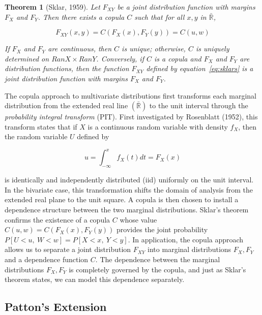 \documentclass[12pt]{article}
\newtheorem{thm}{Theorem}
\begin{document}
\begin{thm} [Sklar, 1959] \label{thm:skl}
Let $F_{XY}$ be a joint distribution function with margins $F_{X}$ and
$F_{Y}$. Then there exists a copula $C$ such that for all $x,y$ in
$\bar{\mathbb{R}}$,

\begin{equation} \label{eq:sklars}
F_{XY}\left( x,y\right) =C\left(F_{X}\left(x\right), F_{Y}\left(y\right)\right) = C\left(u,w\right)
\end{equation}

If $F_{X}$ and $F_{Y}$ are continuous, then $C$ is unique; otherwise, $C$
is uniquely determined on $RanX\times RanY$. Conversely, if $C$ is a copula
and $F_{X}$ and $F_{Y}$ are distribution functions, then the function
$F_{XY}$ defined by equation~\ref{eq:sklars} is a joint distribution
function with margins $F_{X}$ and $F_{Y}$.
\end{thm}

The copula approach to multivariate distributions first transforms each
marginal distribution from the extended real line $\left(\bar{\mathbb{R}}\right)$
to the unit interval through the \textit{probability integral transform}
(PIT). First investigated by Rosenblatt (1952), this transform states that
if $X$ is a continuous random variable with density $f_{X}$, then the
random variable $U$ defined by

\begin{equation} \label{eqn:PIT}
u=\int_{-\infty}^{x}f_{X}\left(t\right) dt=F_{X}\left(x\right)
\end{equation}

is identically and independently distributed (iid) uniformly on the unit
interval. In the bivariate case, this transformation shifts the domain of
analysis from the extended real plane to the unit square. A copula is
then chosen to install a dependence structure between the two marginal
distributions. Sklar's theorem confirms the existence of a copula $C$ whose
value $C\left(u,w\right) = C\left(F_{X}\left(x\right), F_{Y}\left(y\right)\right)$
provides the joint probability $P\left[U < u,~W < w\right] = P\left[X < x,~Y < y\right]$.
In application, the copula approach allows us to separate a joint
distribution $F_{XY}$ into marginal distributions $F_{X},F_{Y}$ and a
dependence function $C$. The dependence between the marginal distributions
$F_{X},F_{Y}$ is completely governed by the copula, and just as Sklar's
theorem states, we can model this dependence separately.

\subsection{Patton's Extension}
\end{document}
